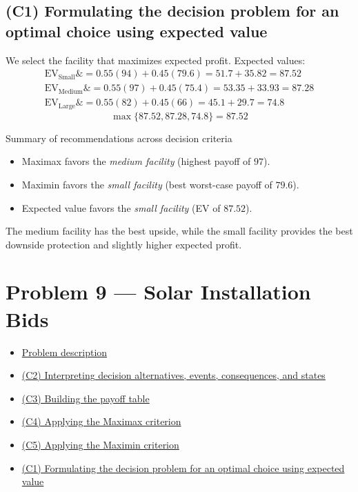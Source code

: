 \documentclass[11pt]{article}
\begin{document}
	\subsection*{(C1) Formulating the decision problem for an optimal choice using expected value}
	
	\hypertarget{problem8-c1}{}
	
	We select the facility that maximizes expected profit. Expected values:
	\[
	\begin{aligned}
		\mathrm{EV}_{\text{Small}} \&= 0.55(94) + 0.45(79.6) = 51.7 + 35.82 = 87.52 \\
		\mathrm{EV}_{\text{Medium}} \&= 0.55(97) + 0.45(75.4) = 53.35 + 33.93 = 87.28 \\
		\mathrm{EV}_{\text{Large}} \&= 0.55(82) + 0.45(66) = 45.1 + 29.7 = 74.8
	\end{aligned}
	\]
	\[
	\max\{87.52, 87.28, 74.8\} = 87.52
	\]
	
	Summary of recommendations across decision criteria
	\begin{itemize}
		\item Maximax favors the \emph{medium facility} (highest payoff of $97$).
		\item Maximin favors the \emph{small facility} (best worst-case payoff of $79.6$).
		\item Expected value favors the \emph{small facility} (EV of $87.52$).
	\end{itemize}
	
	The medium facility has the best upside, while the small facility provides the best downside protection and slightly
	higher expected profit.
	
	\section*{Problem 9 — Solar Installation Bids}
	
	\hypertarget{problem9}{}
	
	\hypertarget{problem9-criteria}{}
	
	
	\begin{itemize}
		\item \hyperlink{problem9-problem}{Problem description}
		\item \hyperlink{problem9-c2}{(C2) Interpreting decision alternatives, events, consequences, and states}
		\item \hyperlink{problem9-c3}{(C3) Building the payoff table}
		\item \hyperlink{problem9-c4}{(C4) Applying the Maximax criterion}
		\item \hyperlink{problem9-c5}{(C5) Applying the Maximin criterion}
		\item \hyperlink{problem9-c1}{(C1) Formulating the decision problem for an optimal choice using expected value}
	\end{itemize}
	
\end{document}
